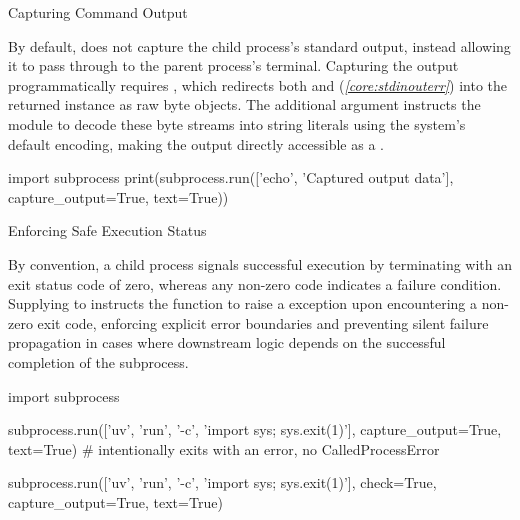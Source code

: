 \documentclass[10pt]{article}
\begin{document}
    \begin{core}{Capturing Command Output}

      By default,  does not capture the child process's standard output, instead allowing it to pass through to the parent process's terminal. Capturing the output programmatically requires , which redirects both  and  (\textit{\autoref{core:stdinouterr}}) into the returned  instance as raw byte objects. The additional argument  instructs the module to decode these byte streams into string literals using the system's default encoding, making the output directly accessible as a .

      \begin{pyconsole}

        import subprocess
        print(subprocess.run(['echo', 'Captured output data'], capture_output=True, text=True))

      \end{pyconsole}

    \end{core}

    \begin{core}{Enforcing Safe Execution Status}

      By convention, a child process signals successful execution by terminating with an exit status code of zero, whereas any non-zero code indicates a failure condition. Supplying  to  instructs the function to raise a  exception upon encountering a non-zero exit code, enforcing explicit error boundaries and preventing silent failure propagation in cases where downstream logic depends on the successful completion of the subprocess.

      \begin{pyconsole}

        import subprocess

        subprocess.run(['uv', 'run', '-c', 'import sys; sys.exit(1)'], capture_output=True, text=True) # intentionally exits with an error, no CalledProcessError

        subprocess.run(['uv', 'run', '-c', 'import sys; sys.exit(1)'], check=True, capture_output=True, text=True)

      \end{pyconsole}

    \end{core}
\end{document}
